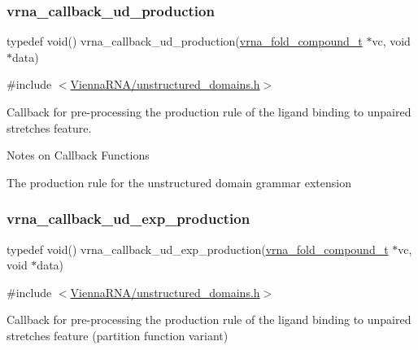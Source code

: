 \subsubsection{\texorpdfstring{vrna\+\_\+callback\+\_\+ud\+\_\+production}{vrna\_callback\_ud\_production}}
{\footnotesize\ttfamily typedef void() vrna\+\_\+callback\+\_\+ud\+\_\+production(\hyperlink{group__fold__compound_ga1b0cef17fd40466cef5968eaeeff6166}{vrna\+\_\+fold\+\_\+compound\+\_\+t} $\ast$vc, void $\ast$data)}



{\ttfamily \#include $<$\hyperlink{unstructured__domains_8h}{Vienna\+R\+N\+A/unstructured\+\_\+domains.\+h}$>$}



Callback for pre-\/processing the production rule of the ligand binding to unpaired stretches feature. 

\begin{DoxyRefDesc}{Notes on Callback Functions}
\item[\hyperlink{callbacks__callbacks000012}{Notes on Callback Functions}]The production rule for the unstructured domain grammar extension \end{DoxyRefDesc}
\mbox{\label{group__domains__up_ga33d78327dcd04c1ca5ab2887edc18c7b}} 
\subsubsection{\texorpdfstring{vrna\+\_\+callback\+\_\+ud\+\_\+exp\+\_\+production}{vrna\_callback\_ud\_exp\_production}}
{\footnotesize\ttfamily typedef void() vrna\+\_\+callback\+\_\+ud\+\_\+exp\+\_\+production(\hyperlink{group__fold__compound_ga1b0cef17fd40466cef5968eaeeff6166}{vrna\+\_\+fold\+\_\+compound\+\_\+t} $\ast$vc, void $\ast$data)}



{\ttfamily \#include $<$\hyperlink{unstructured__domains_8h}{Vienna\+R\+N\+A/unstructured\+\_\+domains.\+h}$>$}



Callback for pre-\/processing the production rule of the ligand binding to unpaired stretches feature (partition function variant) 

